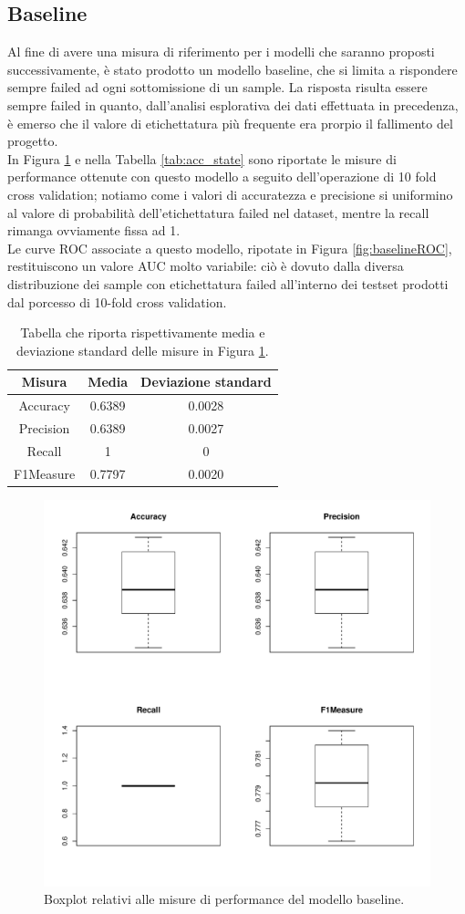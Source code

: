 \subsection{Baseline}
Al fine di avere una misura di riferimento per i modelli che saranno proposti successivamente, è stato prodotto un modello baseline, che si limita a rispondere sempre failed ad ogni sottomissione di un sample. La risposta risulta essere sempre failed in quanto, dall'analisi esplorativa dei dati effettuata in precedenza, è emerso che il valore di etichettatura più frequente era prorpio il fallimento del progetto.\\
In Figura \ref{fig:baselineperformance} e nella Tabella \ref{tab:acc_state} sono riportate le misure di performance ottenute con questo modello a seguito dell'operazione di 10 fold cross validation; notiamo come i valori di accuratezza e precisione si uniformino al valore di  probabilità dell'etichettatura failed nel dataset, mentre la recall rimanga ovviamente fissa ad 1.\\
Le curve ROC associate a questo modello, ripotate in Figura \ref{fig:baselineROC}, restituiscono un valore AUC molto variabile: ciò è dovuto dalla diversa distribuzione dei sample con etichettatura failed all'interno dei testset prodotti dal porcesso di 10-fold cross validation.
\begin{table}
	\caption{Tabella che riporta rispettivamente media e deviazione standard delle misure in Figura \ref{fig:baselineperformance}.}
	\label{tab:baselineperformance}
	\centering
	\begin{tabular}{c|cc}
		Misura & Media & Deviazione standard \\
		\hline
		Accuracy & 0.6389 & 0.0028 \\ 
		Precision & 0.6389 & 0.0027 \\
		Recall & 1 & 0 \\
		F1Measure & 0.7797 & 0.0020 \\
	\end{tabular}
\end{table} 
\begin{figure}
	\centering
	\includegraphics[width=0.7\linewidth]{../FinalResults/Baseline_performance}
	\caption{Boxplot relativi alle misure di performance del modello baseline.}
	\label{fig:baselineperformance}
\end{figure}

